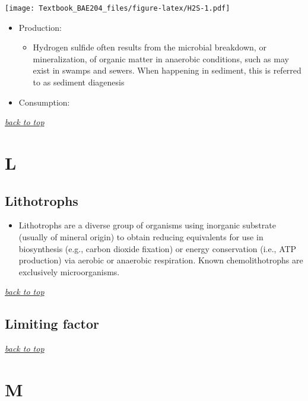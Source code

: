 \documentclass[]{book}
\providecommand{\tightlist}{%
  \setlength{\itemsep}{0pt}\setlength{\parskip}{0pt}}
\theoremstyle{definition}
\theoremstyle{definition}
\theoremstyle{definition}
\theoremstyle{remark}
\begin{document}
\texttt{[image: Textbook\_BAE204\_files/figure-latex/H2S-1.pdf]}

\begin{itemize}
\tightlist
\item
  Production:

  \begin{itemize}
  \tightlist
  \item
    Hydrogen sulfide often results from the microbial breakdown, or
    mineralization, of organic matter in anaerobic conditions, such as
    may exist in swamps and sewers. When happening in sediment, this is
    referred to as sediment diagenesis
  \end{itemize}
\item
  Consumption:
\end{itemize}

\emph{\protect\hyperlink{top}{back to top}}

\section{L}\label{l}

\hypertarget{lithotrophs}{\subsection{Lithotrophs}\label{lithotrophs}}

\begin{itemize}
\tightlist
\item
  Lithotrophs are a diverse group of organisms using inorganic substrate
  (usually of mineral origin) to obtain reducing equivalents for use in
  biosynthesis (e.g., carbon dioxide fixation) or energy conservation
  (i.e., ATP production) via aerobic or anaerobic respiration. Known
  chemolithotrophs are exclusively microorganisms.
  \citep{Wikipedia_contributors2018-na}
\end{itemize}

\emph{\protect\hyperlink{top}{back to top}}

\subsection{Limiting factor}\label{limiting-factor}

\emph{\protect\hyperlink{top}{back to top}}

\section{M}\label{m}
\end{document}

